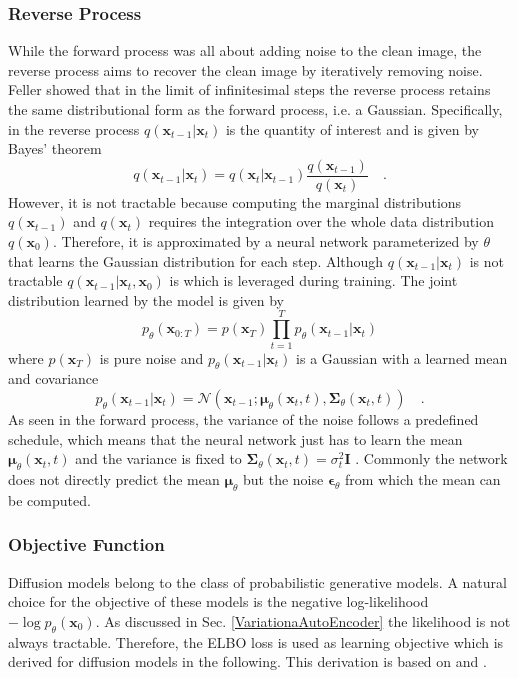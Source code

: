 \subsubsection{Reverse Process } 
While the forward process was all about adding noise to the clean image, the reverse process aims to recover the clean image by iteratively removing noise. Feller \cite{feller1949stochastic} showed that in the limit of infinitesimal steps the reverse process retains the same distributional form as the forward process, i.e. a Gaussian. Specifically, in the reverse process $q(\mathbf{x}_{t-1}| \mathbf{x}_t)$ is the quantity of interest and is given by Bayes' theorem 
\begin{equation}
    q(\mathbf{x}_{t-1}| \mathbf{x}_t) = q(\mathbf{x}_{t}| \mathbf{x}_{t-1}) \frac{q(\mathbf{x}_{t-1})}{q(\mathbf{x}_t)} \quad.
\end{equation}
However, it is not tractable because computing the marginal distributions $q(\mathbf{x}_{t-1})$ and $q(\mathbf{x}_t)$ requires the integration over the whole data distribution $q(\mathbf{x}_0)$. Therefore, it is approximated by a neural network parameterized by $\theta$ that learns the Gaussian distribution for each step. Although $q(\mathbf{x}_{t-1}| \mathbf{x}_t)$ is not tractable $q(\mathbf{x}_{t-1}| \mathbf{x}_t, \mathbf{x}_0)$ is which is leveraged during training.  The joint distribution learned by the model is given by 
\begin{equation}
    p_\theta(\mathbf{x}_{0:T} ) = p(\mathbf{x}_T) \prod_{t=1}^T p_\theta(\mathbf{x}_{t-1} | \mathbf{x}_t)
\end{equation}
where $p(\mathbf{x}_T)$ is pure noise and $p_\theta(\mathbf{x}_{t-1}|\mathbf{x}_t)$ is a Gaussian with a learned mean and covariance 
\begin{equation}
    p_\theta(\mathbf{x}_{t-1}|\mathbf{x}_t) = \mathcal{N}\left( \mathbf{x}_{t-1}; \boldsymbol{\mu}_\theta(\mathbf{x}_t,t), \boldsymbol{\Sigma}_\theta(\mathbf{x}_t,t)  \right) \quad.
\end{equation}
As seen in the forward process, the variance of the noise follows a predefined schedule, which means that the neural network just has to learn the mean $\boldsymbol{\mu}_\theta(\mathbf{x}_t,t)$ and the variance is fixed to $\boldsymbol{\Sigma}_\theta(\mathbf{x}_t,t) = \sigma_t^2 \mathbf{I}$ . Commonly the network does not directly predict the mean $\boldsymbol{\mu}_\theta$ but the noise $\boldsymbol{\epsilon}_\theta$ from which the mean can be computed.

\subsubsection{Objective Function} Diffusion models belong to the class of probabilistic generative models. A natural choice for the objective of these models is the negative log-likelihood $- \log p_\theta(\mathbf{x}_0)$. As discussed in Sec. \ref{VariationaAutoEncoder} the likelihood is not always tractable. Therefore, the \gls{ELBO} loss is used as learning objective which is derived for diffusion models in the following. This derivation is based on \cite{pawlowski2024physics} and \cite{DDPM}. 

